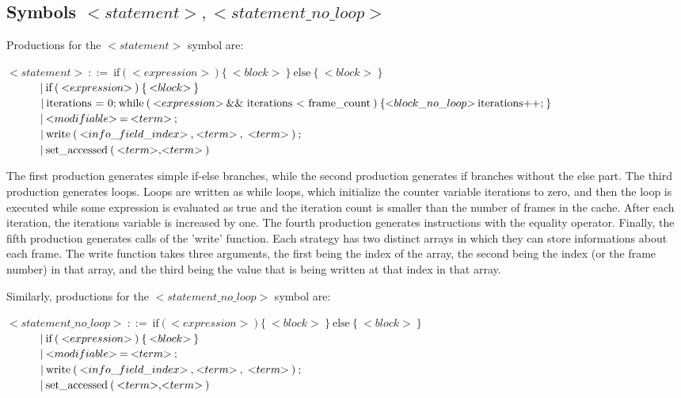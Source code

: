 \subsection{Symbols ${<}statement{>}, {<}statement\_no\_loop{>}$}
Productions for the ${<}statement{>}$ symbol are:

\noindent
$ {<}statement{>}\:::=\:\text{if}\:\text{(}\:{<}expression{>}\:\text{)}\:\text{\{}\:{<}block{>}\:\text{\}}\:\text{else}\:\text{\{}\:{<}block{>}\:\text{\}} $\\
$ \indent\indent |\:\text{if}\:\text{(}\:{<}expression{>}\:\text{)}\:\text{\{}\:{<}block{>}\:\text{\}}$\\
$ \indent\indent |\:\text{iterations = 0;}\:\text{while}\:\text{(}\:{<}expression{>}\:\text{\&\& iterations < frame\_count}\:\text{)}\:\text{\{}\:\\{<}block\_no\_loop{>}\:\text{iterations++;}\:\text{\}} $\\
$ \indent\indent |\:{<}modifiable{>}\:\text{=}\:{<}term{>}\:\text{;} $\\
$ \indent\indent |\:\text{write}\:\text{(}\:{<}info\_field\_index{>}\:\text{,}\:{<}term{>}\:\text{,}\:\:{<}term{>}\:\text{)}\:\text{;} $\\
$ \indent\indent |\:\text{set\_accessed}\:\text{(}\:{<}term{>}\text{,}{<}term{>}\:\text{)}$

The first production generates simple if-else branches, while the second production generates if branches without the else part. The third production generates loops. Loops are written as while loops, which initialize the counter variable iterations to zero, and then the loop is executed while some expression is evaluated as true and the iteration count is smaller than the number of frames in the cache. After each iteration, the iterations variable is increased by one. The fourth production generates instructions with the equality operator. Finally, the fifth production generates calls of the 'write' function. Each strategy has two distinct arrays in which they can store informations about each frame. The write function takes three arguments, the first being the index of the array, the second being the index (or the frame number) in that array, and the third being the value that is being written at that index in that array.

Similarly, productions for the ${<}statement\_no\_loop{>}$ symbol are:

\noindent
$ {<}statement\_no\_loop{>}\:::=\:\text{if}\:\text{(}\:{<}expression{>}\:\text{)}\:\text{\{}\:{<}block{>}\:\text{\}}\:\text{else}\:\text{\{}\:{<}block{>}\:\text{\}} $\\
$ \indent\indent |\:\text{if}\:\text{(}\:{<}expression{>}\:\text{)}\:\text{\{}\:{<}block{>}\:\text{\}}$\\
$ \indent\indent |\:{<}modifiable{>}\:\text{=}\:{<}term{>}\:\text{;} $\\
$ \indent\indent |\:\text{write}\:\text{(}\:{<}info\_field\_index{>}\:\text{,}\:{<}term{>}\:\text{,}\:\:{<}term{>}\:\text{)}\:\text{;} $\\
$ \indent\indent |\:\text{set\_accessed}\:\text{(}\:{<}term{>}\text{,}{<}term{>}\:\text{)}$

